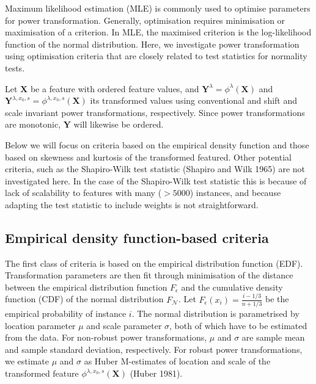 \documentclass[preprint,12pt,authoryear]{elsarticle}
\begin{document}
Maximum likelihood estimation (MLE) is commonly used to optimise
parameters for power transformation. Generally, optimisation requires
minimisation or maximisation of a criterion. In MLE, the maximised
criterion is the log-likelihood function of the normal distribution.
Here, we investigate power transformation using optimisation criteria
that are closely related to test statistics for normality tests.

Let \(\mathbf{X}\) be a feature with ordered feature values, and
\(\mathbf{Y}^\lambda =\phi^{\lambda} \left(\mathbf{X} \right)\) and
\(\mathbf{Y}^{\lambda, x_0, s} =\phi^{\lambda, x_0, s} \left(\mathbf{X} \right)\)
its transformed values using conventional and shift and scale invariant
power transformations, respectively. Since power transformations are
monotonic, \(\mathbf{Y}\) will likewise be ordered.

Below we will focus on criteria based on the empirical density function
and those based on skewness and kurtosis of the transformed featured.
Other potential criteria, such as the Shapiro-Wilk test statistic
(Shapiro and Wilk 1965) are not investigated here. In the case of the
Shapiro-Wilk test statistic this is because of lack of scalability to
features with many (\(> 5000\)) instances, and because adapting the test
statistic to include weights is not straightforward.

\subsection{Empirical density function-based
criteria}\label{empirical-density-function-based-criteria}

The first class of criteria is based on the empirical distribution
function (EDF). Transformation parameters are then fit through
minimisation of the distance between the empirical distribution function
\(F_{\epsilon}\) and the cumulative density function (CDF) of the normal
distribution \(F_{\mathcal{N}}\). Let
\(F_{\epsilon}\left(x_i \right) = \frac{i - 1/3}{n + 1/3}\) be the
empirical probability of instance \(i\). The normal distribution is
parametrised by location parameter \(\mu\) and scale parameter
\(\sigma\), both of which have to be estimated from the data. For
non-robust power transformations, \(\mu\) and \(\sigma\) are sample mean
and sample standard deviation, respectively. For robust power
transformations, we estimate \(\mu\) and \(\sigma\) as Huber M-estimates
of location and scale of the transformed feature
\(\phi^{\lambda, x_0, s} (\mathbf{X})\) (Huber 1981).
\end{document}
